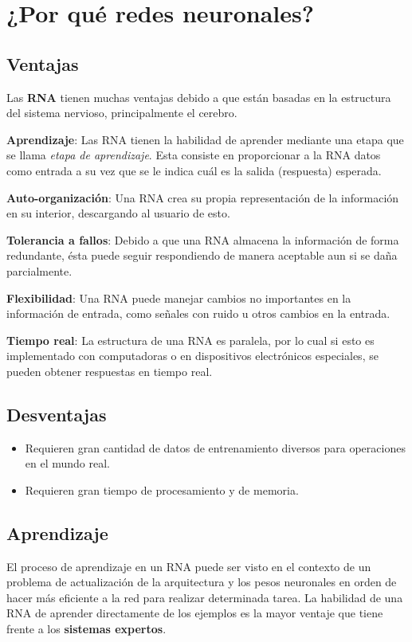 \documentclass[10pt,a4paper]{article}
\begin{document}
\pagebreak

\section{¿Por qué redes neuronales?}

\subsection{Ventajas}
Las \textbf{RNA} tienen muchas ventajas debido a que están basadas en la estructura del sistema nervioso, principalmente el cerebro.
\begin{description}
\item \textbf{Aprendizaje}: Las RNA tienen la habilidad de aprender mediante una etapa que se llama \textit{etapa de aprendizaje}. Esta consiste en proporcionar a la RNA datos como entrada a su vez que se le indica cuál es la salida (respuesta) esperada.
\item \textbf{Auto-organización}: Una RNA crea su propia representación de la información en su interior, descargando al usuario de esto.
\item \textbf{Tolerancia a fallos}: Debido a que una RNA almacena la información de forma redundante, ésta puede seguir respondiendo de manera aceptable aun si se daña parcialmente.
\item \textbf{Flexibilidad}: Una RNA puede manejar cambios no importantes en la información de entrada, como señales con ruido u otros cambios en la entrada.
\item \textbf{Tiempo real}: La estructura de una RNA es paralela, por lo cual si esto es implementado con computadoras o en dispositivos electrónicos especiales, se pueden obtener respuestas en tiempo real.
\end{description}

\subsection{Desventajas}

\begin{itemize}
\item Requieren gran cantidad de datos de entrenamiento diversos para operaciones en el mundo real.
\item Requieren gran tiempo de procesamiento y de memoria.
\end{itemize}

\subsection{Aprendizaje}
El proceso de aprendizaje en un RNA puede ser visto en el contexto de un problema de actualización de la arquitectura y los pesos neuronales en orden de hacer más eficiente a la red para realizar determinada tarea. La habilidad de una RNA de aprender directamente de los ejemplos es la mayor ventaje que tiene frente a los \textbf{sistemas expertos}.
\end{document}
